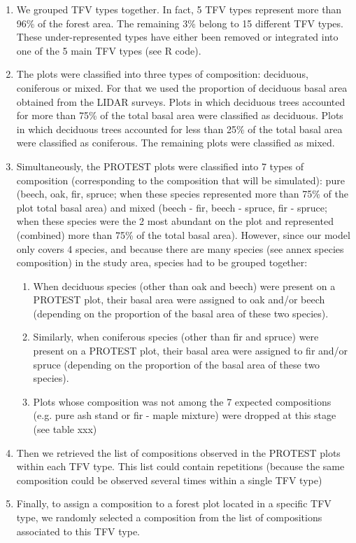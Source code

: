\documentclass[a4paper]{article}
\begin{document}
\begin{enumerate}
    \item We grouped TFV types together. In fact, 5 TFV types represent more than 96\% of the forest area. The remaining 3\% belong to 15 different TFV types. These under-represented types have either been removed or integrated into one of the 5 main TFV types (see R code).
    \item The plots were classified into three types of composition: deciduous, coniferous or mixed. For that we used the proportion of deciduous basal area obtained from the LIDAR surveys. Plots in which deciduous trees accounted for more than 75\% of the total basal area were classified as deciduous. Plots in which deciduous trees accounted for less than 25\% of the total basal area were classified as coniferous. The remaining plots were classified as mixed.
    \item Simultaneously, the PROTEST plots were classified into 7 types of composition (corresponding to the composition that will be simulated): pure (beech, oak, fir, spruce; when these species represented more than 75\% of the plot total basal area) and mixed (beech - fir, beech - spruce, fir - spruce; when these species were the 2 most abundant on the plot and represented (combined) more than 75\% of the total basal area). However, since our model only covers 4 species, and because there are many species (see annex species composition) in the study area, species had to be grouped together:
    \begin{enumerate}
        \item When deciduous species (other than oak and beech) were present on a PROTEST plot, their basal area were assigned to oak and/or beech (depending on the proportion of the basal area of these two species).
        \item Similarly, when coniferous species (other than fir and spruce) were present on a PROTEST plot, their basal area were assigned to fir and/or spruce (depending on the proportion of the basal area of these two species).
        \item Plots whose composition was not among the 7 expected compositions (e.g. pure ash stand or fir - maple mixture) were dropped at this stage (see table xxx)
    \end{enumerate}
    \item Then we retrieved the list of compositions observed in the PROTEST plots within each TFV type. This list could contain repetitions (because the same composition could be observed several times within a single TFV type)
    \item Finally, to assign a composition to a forest plot located in a specific TFV type, we randomly selected a composition from the list of compositions associated to this TFV type.
\end{enumerate}
\end{document}
